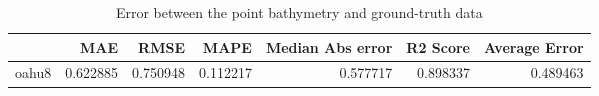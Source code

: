 \begin{table}[h!]
\caption{Error between the point bathymetry and ground-truth data}
\label{tab:oahu8_lidar_error}
\begin{tabular}{lrrrrrr}
\toprule
 & MAE & RMSE & MAPE & Median Abs error & R2 Score & Average Error \\
\midrule
oahu8 & 0.622885 & 0.750948 & 0.112217 & 0.577717 & 0.898337 & 0.489463 \\
\bottomrule
\end{tabular}
\end{table}
